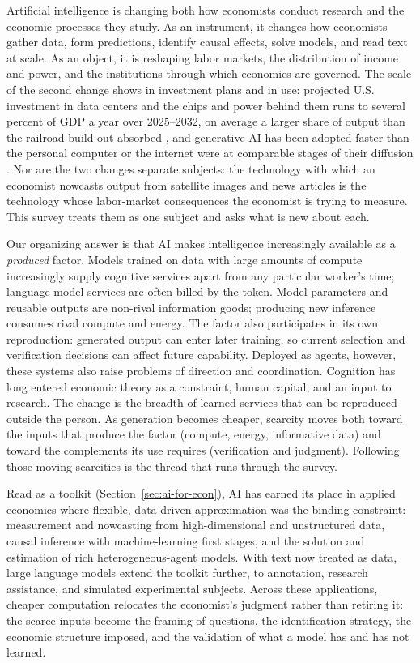 \documentclass[12pt]{article}
\theoremstyle{plain}
\theoremstyle{definition}
\theoremstyle{remark}
\begin{document}
Artificial intelligence is changing both how economists conduct
research and the economic processes they study. As an
instrument, it changes how economists gather data, form predictions,
identify causal effects, solve models, and read text at scale. As an
object, it is reshaping labor markets, the distribution of income and
power, and the institutions through which economies are governed. The
scale of the second change shows in investment plans and in use: projected
U.S. investment in data
centers and the chips and power behind them runs to several percent of
GDP a year over 2025--2032, on average a larger share of output than the
railroad build-out absorbed \citep{VanNieuwerburgh2026BrookingsAICapex},
and generative AI has been adopted faster than the personal
computer or the internet were at comparable stages of their diffusion
\citep{BickBlandinDeming2025}. Nor
are the two changes separate subjects: the technology with which an
economist nowcasts output from satellite images and news articles is the
technology whose labor-market consequences the economist is trying to
measure. This survey treats them as one subject and asks what is new
about each.

Our organizing answer is that AI makes intelligence increasingly
available as a \emph{produced} factor. Models trained on data with large amounts of compute increasingly supply cognitive services apart from any particular worker's
time; language-model services are often billed by the token. Model
parameters and reusable outputs are non-rival information goods;
producing new inference consumes rival compute and energy. The factor
also participates in its own reproduction: generated output can enter
later training, so current selection and verification decisions can
affect future capability. Deployed as agents, however, these systems also raise problems of
direction and coordination. Cognition has long entered economic theory
as a constraint, human capital, and an input to research. The change is
the breadth of learned services that can be reproduced outside the
person. As generation becomes cheaper, scarcity moves both toward the inputs
that produce the factor (compute, energy, informative data) and toward
the complements its use requires (verification and judgment). Following
those moving scarcities is the thread that runs through the survey.

Read as a toolkit (Section~\ref{sec:ai-for-econ}),
AI has earned its
place in applied economics where flexible, data-driven approximation
was the binding constraint: measurement and nowcasting from
high-dimensional and unstructured data, causal inference with
machine-learning first stages, and the solution and estimation of rich
heterogeneous-agent models. With text now treated as data, large language
models extend the toolkit further, to annotation, research assistance,
and simulated experimental subjects. Across these
applications, cheaper computation relocates the economist's judgment
rather than retiring it: the scarce inputs become the framing of
questions, the identification strategy, the economic structure imposed,
and the validation of what a model has and has not learned.
\end{document}
